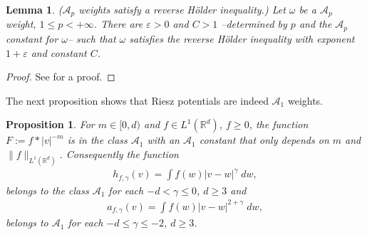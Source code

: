 \documentclass[12pt,american]{amsart}
\numberwithin{equation}{section}
\theoremstyle{plain}
\newtheorem{lem}[thm]{Lemma}
\newtheorem{prop}[thm]{Proposition}
\theoremstyle{definition}                  %
\begin{document}
  \begin{lem}\label{lem:A_p implies reverse Holder}
    \emph{($\mathcal{A}_p$ weights satisfy a reverse H\"older inequality.)} Let $\omega$ be a $\mathcal{A}_p$ weight, $1\leq p< +\infty$. There are $\varepsilon >0$ and $C>1$ --determined by $p$ and the $\mathcal{A}_p$ constant for $\omega$-- such that $\omega$ satisfies the reverse H\"older inequality with exponent $1+\varepsilon$ and constant $C$.
  \end{lem}	  
  \begin{proof}
    See \cite[Chapter 4, Lemma 2.5]{GarciaCuervaRubioDeFrancia1985} for a proof.  
  \end{proof}  

  The next proposition shows that Riesz potentials are indeed $\mathcal{A}_1$ weights.
  
  \begin{prop}\label{prop: Riesz potentials are A1 weights}
  For $m \in [0,d)$ and $f\in L^1(\mathbb{R}^d)$, $f\geq 0$, the function $F:=f* |v|^{-m}$ is in the class $\mathcal{A}_1$ with an $\mathcal{A}_1$ constant that only depends on $m$ and $\|f\|_{L^1(\mathbb{R}^d)}$. Consequently the function 
  \begin{align*}
    h_{f,\gamma}(v)= \int f(w)|v-w|^\gamma \;dw,
  \end{align*}
  belongs to the  class $\mathcal{A}_1$ for each $-d<\gamma \le 0$, $d\ge3$ and 
  \begin{align*}
  a_{f,\gamma}(v)= \int f(w)|v-w|^{2+\gamma}\; dw,
  \end{align*}
  belongs to $\mathcal{A}_1$ for each $-d\le \gamma \le -2$, $d\ge3$.
  
\end{prop}	  
\end{document}

